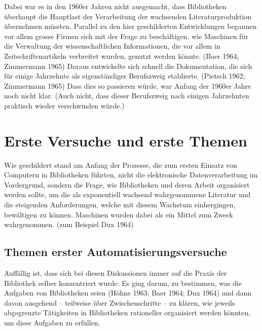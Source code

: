 \documentclass[a4paper,
fontsize=11pt,
oneside,
numbers=noperiodatend,
parskip=half-,
bibliography=totoc,
final
]{scrartcl}
\begin{document}
Dabei war es in den 1960er Jahren nicht ausgemacht, dass Bibliotheken
überhaupt die Hauptlast der Verarbeitung der wachsenden
Literaturproduktion übernehmen müssten. Parallel zu den hier
geschilderten Entwicklungen begannen vor allem grosse Firmen sich mit
der Frage zu beschäftigen, wie Maschinen für die Verwaltung der
wissenschaftlichen Informationen, die vor allem in Zeitschriftenartikeln
verbreitet wurden, genutzt werden könnte. (Baer 1964; Zimmermann 1965)
Daraus entwickelte sich schnell die Dokumentation, die sich für einige
Jahrzehnte als eigenständiger Berufszweig etablierte. (Pietsch 1962;
Zimmermann 1965) Dass dies so passieren würde, war Anfang der 1960er
Jahre noch nicht klar. (Auch nicht, dass dieser Berufszweig nach einigen
Jahrzehnten praktisch wieder verschwinden würde.)

\hypertarget{erste-versuche-und-erste-themen}{%
\section{Erste Versuche und erste
Themen}\label{erste-versuche-und-erste-themen}}

Wie geschildert stand am Anfang der Prozesse, die zum ersten Einsatz von
Computern in Bibliotheken führten, nicht die elektronische
Datenverarbeitung im Vordergrund, sondern die Frage, wie Bibliotheken
und deren Arbeit organisiert werden sollte, um die als exponentiell
wachsend wahrgenommene Literatur und die steigenden Anforderungen,
welche mit diesem Wachstum einhergingen, bewältigen zu können. Maschinen
wurden dabei als ein Mittel zum Zweck wahrgenommen. (zum Beispiel Dux
1964)

\hypertarget{themen-erster-automatisierungsversuche}{%
\subsection{Themen erster
Automatisierungsversuche}\label{themen-erster-automatisierungsversuche}}

Auffällig ist, dass sich bei diesen Diskussionen immer auf die Praxis
der Bibliothek selber konzentriert wurde: Es ging darum, zu bestimmen,
was die Aufgaben von Bibliotheken seien (Höhne 1963; Baer 1964; Dux
1964) und dann davon ausgehend -- teilweise über Zwischenschritte -- zu
klären, wie jeweils abgegrenzte Tätigkeiten in Bibliotheken rationeller
organisiert werden könnten, um diese Aufgaben zu erfüllen.
\end{document}
